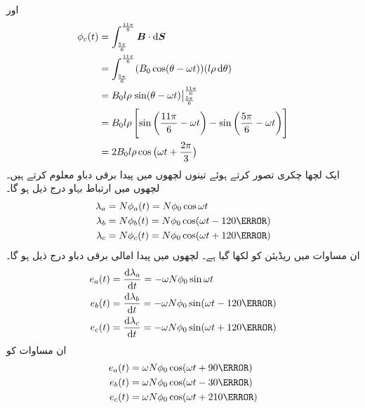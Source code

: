 اور
\begin{gather}
\begin{aligned}
\phi_c(t)&=\int_{\frac{5\pi}{6}}^{\frac{11\pi}{6}} \kvec{B} \cdot \dif \kvec{S}\\
&=\int_{\frac{5\pi}{6}}^{\frac{11\pi}{6}} (B_0 \cos (\theta-\omega t))(l \rho \dif \theta)\\
&=B_0 l \rho \left. \sin (\theta-\omega t) \right\vert_{\frac{5\pi}{6}}^{\frac{11\pi}{6}}\\
&=B_0 l \rho \left[\sin \left(\frac{11\pi}{6}-\omega t \right )-\sin \left (\frac{5\pi}{6}-\omega t \right) \right]\\
&=2 B_0 l \rho \cos \big(\omega t+\frac{2\pi}{3}\big)
\end{aligned}
\end{gather}
ایک لچھا   چکری تصور کرتے ہوئے تینوں لچھوں میں پیدا برقی دباو معلوم کرتے ہیں۔لچھوں میں ارتباط بہاو درج ذیل ہو گا۔
\begin{gather}
\begin{aligned}\label{مساوات_گھومتے_مشین_ارتباط_بہاو_تینوں}
\lambda_a&=N \phi_a (t)=N \phi_0 \cos \omega t\\
\lambda_b&=N \phi_b (t)=N \phi_0 \cos (\omega t-120\degree)\\
\lambda_c&=N \phi_c (t)=N \phi_0 \cos (\omega t+120\degree)
\end{aligned}
\end{gather}
ان مساوات میں  ریڈیئن کو  لکھا گیا ہے۔ لچھوں میں پیدا امالی برقی دباو درج ذیل ہو گا۔
\begin{gather}
\begin{aligned}\label{مساوات_گھومتے_مشین_تین_دور_سائن_نما_برقی_دباو_الف}
e_a(t)&=\frac{\dif \lambda_a}{\dif t}=-\omega N \phi_0 \sin \omega t\\
e_b(t)&=\frac{\dif \lambda_b}{\dif t}=-\omega N \phi_0 \sin (\omega t-120\degree)\\
e_c(t)&=\frac{\dif \lambda_c}{\dif t}=-\omega N \phi_0 \sin (\omega t+120\degree)
\end{aligned}
\end{gather}
ان مساوات کو 
\begin{gather}
\begin{aligned}\label{مساوات_گھومتے_مشین_تین_دور_سائن_نما_برقی_دباو}
e_a(t)&=\omega N \phi_0 \cos (\omega t +90\degree)\\
e_b(t)&=\omega N \phi_0 \cos (\omega t-30\degree)\\
e_c(t)&=\omega N \phi_0 \cos (\omega t+210\degree)
\end{aligned}
\end{gather}
